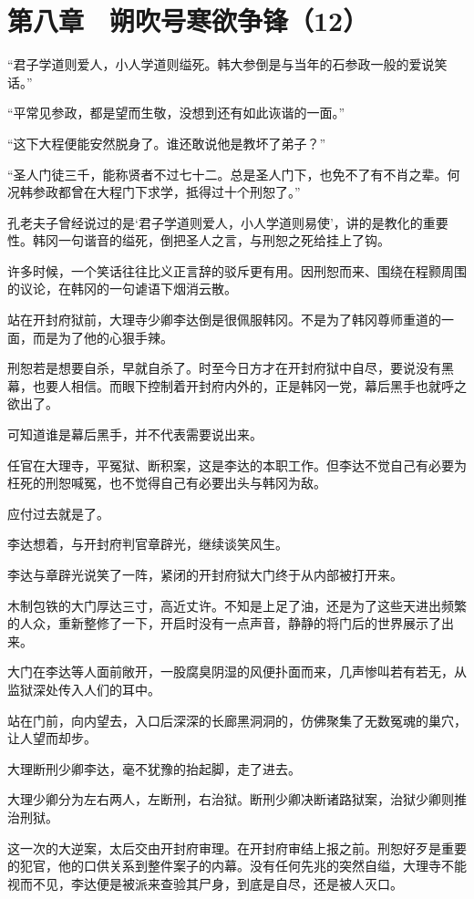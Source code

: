 \section{第八章　朔吹号寒欲争锋（12）}

“君子学道则爱人，小人学道则缢死。韩大参倒是与当年的石参政一般的爱说笑话。”

“平常见参政，都是望而生敬，没想到还有如此诙谐的一面。”

“这下大程便能安然脱身了。谁还敢说他是教坏了弟子？”

“圣人门徒三千，能称贤者不过七十二。总是圣人门下，也免不了有不肖之辈。何况韩参政都曾在大程门下求学，抵得过十个刑恕了。”

孔老夫子曾经说过的是‘君子学道则爱人，小人学道则易使’，讲的是教化的重要性。韩冈一句谐音的缢死，倒把圣人之言，与刑恕之死给挂上了钩。

许多时候，一个笑话往往比义正言辞的驳斥更有用。因刑恕而来、围绕在程颢周围的议论，在韩冈的一句谑语下烟消云散。

站在开封府狱前，大理寺少卿李达倒是很佩服韩冈。不是为了韩冈尊师重道的一面，而是为了他的心狠手辣。

刑恕若是想要自杀，早就自杀了。时至今日方才在开封府狱中自尽，要说没有黑幕，也要人相信。而眼下控制着开封府内外的，正是韩冈一党，幕后黑手也就呼之欲出了。

可知道谁是幕后黑手，并不代表需要说出来。

任官在大理寺，平冤狱、断积案，这是李达的本职工作。但李达不觉自己有必要为枉死的刑恕喊冤，也不觉得自己有必要出头与韩冈为敌。

应付过去就是了。

李达想着，与开封府判官章辟光，继续谈笑风生。

李达与章辟光说笑了一阵，紧闭的开封府狱大门终于从内部被打开来。

木制包铁的大门厚达三寸，高近丈许。不知是上足了油，还是为了这些天进出频繁的人众，重新整修了一下，开启时没有一点声音，静静的将门后的世界展示了出来。

大门在李达等人面前敞开，一股腐臭阴湿的风便扑面而来，几声惨叫若有若无，从监狱深处传入人们的耳中。

站在门前，向内望去，入口后深深的长廊黑洞洞的，仿佛聚集了无数冤魂的巢穴，让人望而却步。

大理断刑少卿李达，毫不犹豫的抬起脚，走了进去。

大理少卿分为左右两人，左断刑，右治狱。断刑少卿决断诸路狱案，治狱少卿则推治刑狱。

这一次的大逆案，太后交由开封府审理。在开封府审结上报之前。刑恕好歹是重要的犯官，他的口供关系到整件案子的内幕。没有任何先兆的突然自缢，大理寺不能视而不见，李达便是被派来查验其尸身，到底是自尽，还是被人灭口。

